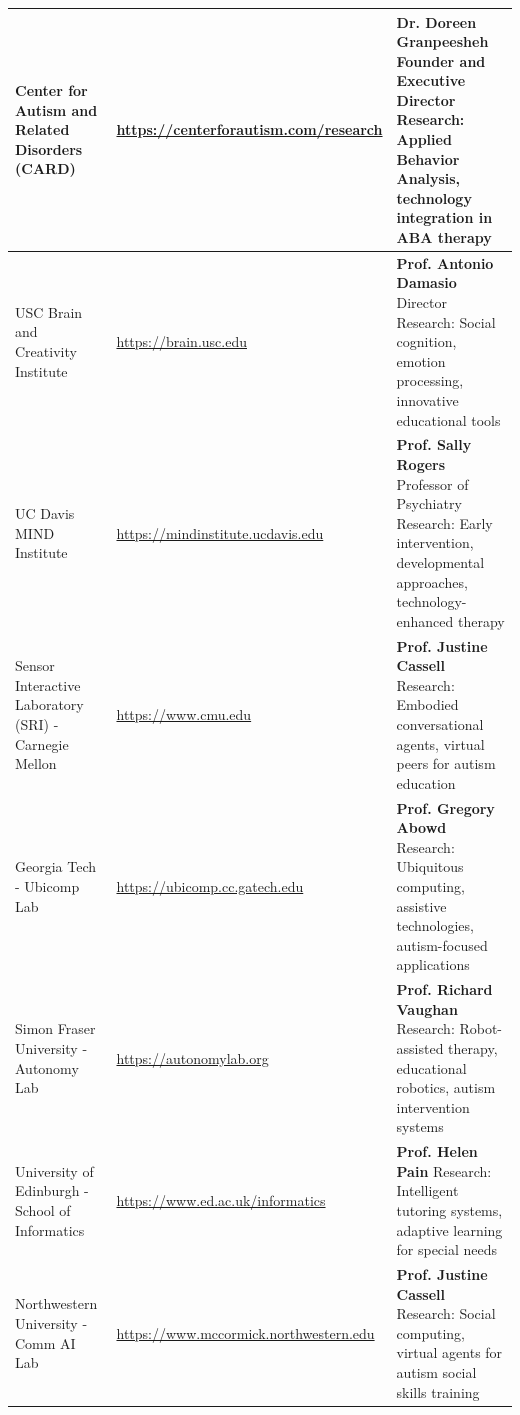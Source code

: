 \documentclass[12pt,a4paper]{article}
\begin{document}
\begin{longtable}{|>{\raggedright}p{4.8cm}|>{\raggedright}p{4.2cm}|>{\raggedright\arraybackslash}p{5.5cm}|}
Center for Autism and Related Disorders (CARD) & 
\url{https://centerforautism.com/research} & 
\textbf{Dr. Doreen Granpeesheh}
\newline Founder and Executive Director
\newline Research: Applied Behavior Analysis, technology integration in ABA therapy \\
\hline

USC Brain and Creativity Institute & 
\url{https://brain.usc.edu} & 
\textbf{Prof. Antonio Damasio}
\newline Director
\newline Research: Social cognition, emotion processing, innovative educational tools \\
\hline

UC Davis MIND Institute & 
\url{https://mindinstitute.ucdavis.edu} & 
\textbf{Prof. Sally Rogers}
\newline Professor of Psychiatry
\newline Research: Early intervention, developmental approaches, technology-enhanced therapy \\
\hline

Sensor Interactive Laboratory (SRI) - Carnegie Mellon & 
\url{https://www.cmu.edu} & 
\textbf{Prof. Justine Cassell}
\newline Research: Embodied conversational agents, virtual peers for autism education \\
\hline

Georgia Tech - Ubicomp Lab & 
\url{https://ubicomp.cc.gatech.edu} & 
\textbf{Prof. Gregory Abowd}
\newline Research: Ubiquitous computing, assistive technologies, autism-focused applications \\
\hline

Simon Fraser University - Autonomy Lab & 
\url{https://autonomylab.org} & 
\textbf{Prof. Richard Vaughan}
\newline Research: Robot-assisted therapy, educational robotics, autism intervention systems \\
\hline

University of Edinburgh - School of Informatics & 
\url{https://www.ed.ac.uk/informatics} & 
\textbf{Prof. Helen Pain}
\newline Research: Intelligent tutoring systems, adaptive learning for special needs \\
\hline

Northwestern University - Comm AI Lab & 
\url{https://www.mccormick.northwestern.edu} & 
\textbf{Prof. Justine Cassell}
\newline Research: Social computing, virtual agents for autism social skills training \\
\hline


\end{longtable}
\end{document}
